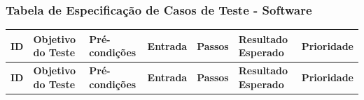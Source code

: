 \subsubsection*{Tabela de Especificação de Casos de Teste - Software}
\begin{longtable}{|p{1cm}|p{2cm}|p{2cm}|p{2.2cm}|p{2cm}|p{2cm}|p{2.1cm}|}
  \hline
  \textbf{ID} & \textbf{Objetivo do Teste} & \textbf{Pré-condições} & \textbf{Entrada} & \textbf{Passos} & \textbf{Resultado Esperado} & \textbf{Prioridade} \\
  \hline
  \endfirsthead
  
  \hline
  \textbf{ID} & \textbf{Objetivo do Teste} & \textbf{Pré-condições} & \textbf{Entrada} & \textbf{Passos} & \textbf{Resultado Esperado} & \textbf{Prioridade} \\
  \hline
  \endhead
  

\end{longtable}

